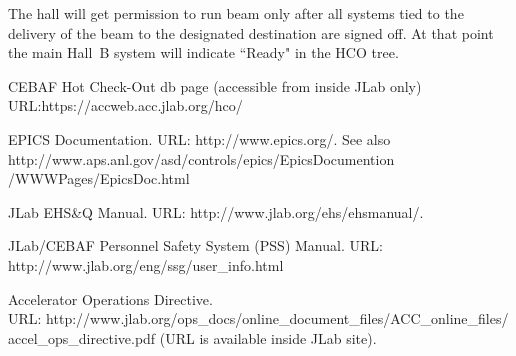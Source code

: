 \documentclass[12pt]{report}
\begin{document}
The hall will get permission to run beam only after all systems tied to the delivery of the 
beam to the designated destination are signed off. At that point the main Hall~B system will 
indicate ``Ready" in the HCO tree.





































\begin{thebibliography}{99}
 CEBAF Hot Check-Out db page (accessible from inside JLab only)
URL:https://accweb.acc.jlab.org/hco/

EPICS Documentation. URL: http://www.epics.org/. 
See also http://www.aps.anl.gov/asd/controls/epics/EpicsDocumention\\/WWWPages/EpicsDoc.html

JLab EHS\&Q Manual. URL: http://www.jlab.org/ehs/ehsmanual/.

JLab/CEBAF Personnel Safety System (PSS) Manual. URL: http://www.jlab.org/eng/ssg/user\_info.html

Accelerator Operations Directive. \\
URL: http://www.jlab.org/ops\_docs/online\_document\_files/ACC\_online\_files/\\accel\_ops\_directive.pdf (URL is available inside JLab site). 

\end{thebibliography}
\end{document}
